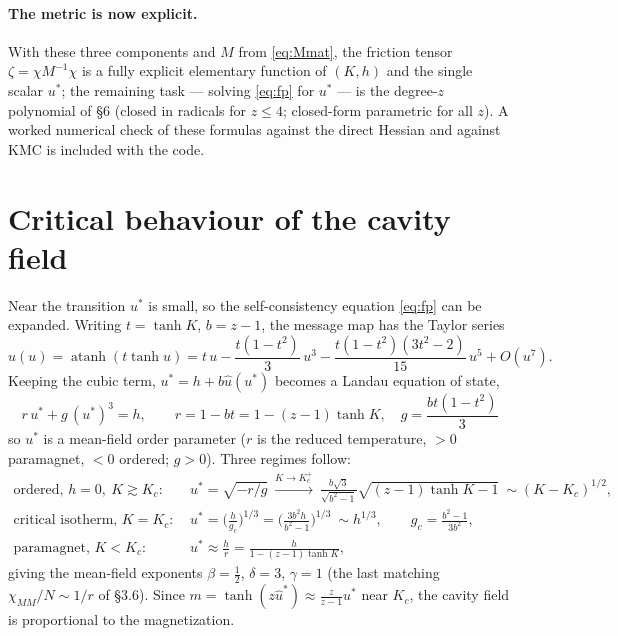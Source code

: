 \documentclass[11pt]{article}
\newcommand{\atanh}{\operatorname{atanh}}
\begin{document}
\paragraph{The metric is now explicit.}
With these three components and $M$ from \eqref{eq:Mmat}, the friction tensor
$\zeta=\chi M^{-1}\chi$ is a fully explicit elementary function of $(K,h)$ and the single scalar
$u^*$; the remaining task --- solving \eqref{eq:fp} for $u^*$ --- is the degree-$z$ polynomial of
\S6 (closed in radicals for $z\le4$; closed-form parametric for all $z$). A worked numerical check
of these formulas against the direct Hessian and against KMC is included with the code.

\section{Critical behaviour of the cavity field}
\label{app:crit}

Near the transition $u^*$ is small, so the self-consistency equation \eqref{eq:fp} can be expanded.
Writing $t=\tanh K$, $b=z-1$, the message map has the Taylor series
\begin{equation}
\hat u(u)=\atanh(t\tanh u)=t\,u-\frac{t(1-t^2)}{3}\,u^3-\frac{t(1-t^2)(3t^2-2)}{15}\,u^5+O(u^7).
\end{equation}
Keeping the cubic term, $u^*=h+b\hat u(u^*)$ becomes a Landau equation of state,
\begin{equation}
\boxed{\;r\,u^*+g\,(u^*)^3=h,\qquad r=1-bt=1-(z-1)\tanh K,\quad g=\frac{bt(1-t^2)}{3}\;}
\label{eq:landau}
\end{equation}
so $u^*$ is a mean-field order parameter ($r$ is the reduced temperature, $>0$ paramagnet, $<0$ ordered;
$g>0$). Three regimes follow:
\begin{align}
\text{ordered, }h=0,\ K\!\gtrsim\!K_c:\quad
&u^*=\sqrt{-r/g}
\ \xrightarrow{K\to K_c^+}\ \frac{b\sqrt3}{\sqrt{b^2-1}}\sqrt{(z{-}1)\tanh K-1}\ \sim(K{-}K_c)^{1/2},\\
\text{critical isotherm, }K\!=\!K_c:\quad
&u^*=\Big(\tfrac{h}{g_c}\Big)^{1/3}=\Big(\tfrac{3b^2h}{b^2-1}\Big)^{1/3}\ \sim h^{1/3},\qquad g_c=\tfrac{b^2-1}{3b^2},\\
\text{paramagnet, }K\!<\!K_c:\quad
&u^*\approx\frac{h}{r}=\frac{h}{1-(z-1)\tanh K},
\end{align}
giving the mean-field exponents $\beta=\tfrac12$, $\delta=3$, $\gamma=1$ (the last matching
$\chi_{MM}/N\sim1/r$ of \S3.6). Since $m=\tanh(z\hat u^*)\approx\tfrac{z}{z-1}u^*$ near $K_c$, the cavity
field is proportional to the magnetization.
\end{document}
